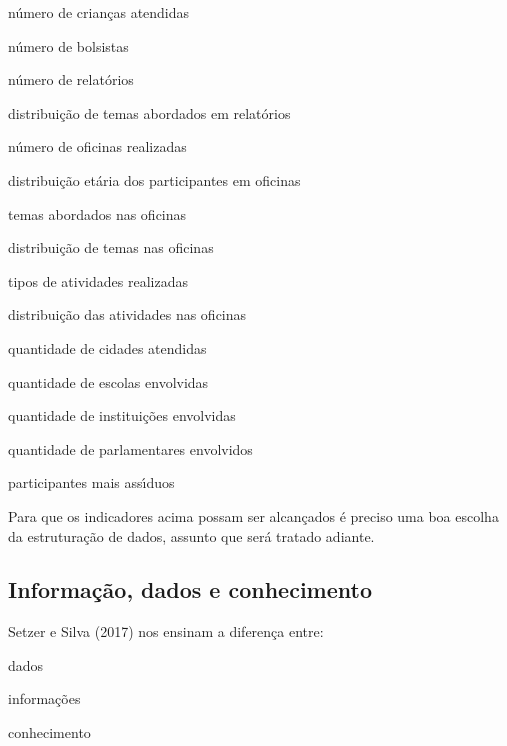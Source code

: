 \documentclass[
12pt,		%
openright,	%
twoside,  %
a4paper,			%
chapter=TITLE,		%
english,			%
french,				%
spanish,			%
brazil				%
]{USPSC-classe/USPSC}
\begin{document}
\begin{alineas}
\item n\'umero de crian\c{c}as atendidas
\item n\'umero de bolsistas
\item n\'umero de relat\'orios
\item distribui\c{c}\~ao de temas abordados em relat\'orios
\item n\'umero de oficinas realizadas
\item distribui\c{c}\~ao et\'aria dos participantes em oficinas
\item temas abordados nas oficinas
\item distribui\c{c}\~ao de temas nas oficinas
\item tipos de atividades realizadas
\item distribui\c{c}\~ao das atividades nas oficinas
\item quantidade de cidades atendidas
\item quantidade de escolas envolvidas
\item quantidade de institui\c{c}\~oes envolvidas
\item quantidade de parlamentares envolvidos
\item participantes mais ass\'{\i}duos
\end{alineas}

Para que os indicadores acima possam ser alcan\c{c}ados \'e preciso uma boa escolha da estrutura\c{c}\~ao de dados, assunto que ser\'a tratado adiante.









\subsection[Informa\c{c}\~ao, dados e conhecimento]{Informa\c{c}\~ao, dados e conhecimento}\label{Informa\c{c}\~ao, dados e conhecimento}
 Setzer e Silva (2017)  nos ensinam a diferen\c{c}a entre:










\begin{alineas}
\item dados
\item informa\c{c}\~oes
\item conhecimento
\end{alineas}
\end{document}
